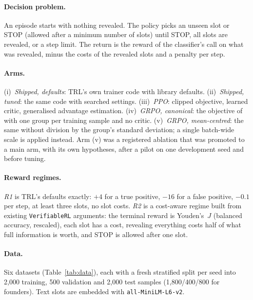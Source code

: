\documentclass[11pt,a4paper]{article}
\begin{document}
\paragraph{Decision problem.} An episode starts with nothing revealed. The policy picks an unseen slot or STOP
(allowed after a minimum number of slots) until STOP, all slots are revealed, or a step limit. The return is the
reward of the classifier's call on what was revealed, minus the costs of the revealed slots and a penalty per
step.

\paragraph{Arms.} (i)~\emph{Shipped, defaults}: TRL's own trainer code with library defaults.
(ii)~\emph{Shipped, tuned}: the same code with searched settings. (iii)~\emph{PPO}: clipped objective, learned
critic, generalised advantage estimation. (iv)~\emph{GRPO, canonical}: the objective of
\citet{shao2024deepseekmath} with one group per training sample and no critic. (v)~\emph{GRPO, mean-centred}:
the same without division by the group's standard deviation; a single batch-wide scale is applied instead. Arm
(v) was a registered ablation that was promoted to a main arm, with its own hypotheses, after a pilot on one
development seed and before tuning.

\paragraph{Reward regimes.} \emph{R1} is TRL's defaults exactly: $+4$ for a true positive, $-16$ for a false
positive, $-0.1$ per step, at least three slots, no slot costs. \emph{R2} is a cost-aware regime built from
existing \texttt{VerifiableRL} arguments: the terminal reward is Youden's~$J$ (balanced accuracy, rescaled), each
slot has a cost, revealing everything costs half of what full information is worth, and STOP is allowed after one
slot.

\paragraph{Data.} Six datasets (Table~\ref{tab:data}), each with a fresh stratified split per seed into 2{,}000
training, 500 validation and 2{,}000 test samples (1{,}800/400/800 for founders). Text slots are embedded with
\texttt{all-MiniLM-L6-v2}.
\end{document}
